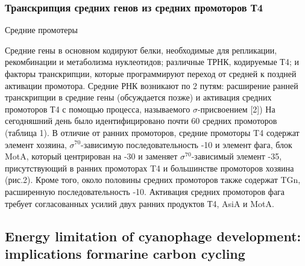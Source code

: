 \documentclass[a4paper,12pt]{article}
\begin{document}
    \subsubsection{Транскрипция средних генов из средних промоторов Т4}
        {\Large Средние промотеры}
        \par{Средние гены в основном кодируют белки, необходимые для репликации, рекомбинации и метаболизма нуклеотидов;
        различные ТРНК, кодируемые Т4; и факторы транскрипции, которые программируют переход от средней к поздней
        активации промотора. Средние РНК возникают по 2 путям: расширение ранней транскрипции в средние гены (обсуждается
        позже) и активация средних промоторов Т4 с помощью процесса, называемого $\sigma$-присвоением [2]) На сегодняшний
        день было идентифицировано почти 60 средних промоторов (таблица 1). В отличие от ранних промоторов, средние
        промоторы T4 содержат элемент хозяина, $\sigma^{70}$-зависимую последовательность -10 и элемент фага, блок MotA,
        который центрирован на -30 и заменяет $\sigma^{70}$-зависимый элемент -35, присутствующий в ранних промоторах T4
        и большинстве промоторов хозяина (рис.2). Кроме того, около половины средних промоторов также содержат TGn,
        расширенную последовательность -10. Активация средних промоторов фага требует согласованных усилий двух ранних
        продуктов Т4, AsiA и MotA.}

\subsection{Energy limitation of cyanophage development: implications formarine carbon cycling}
\end{document}
